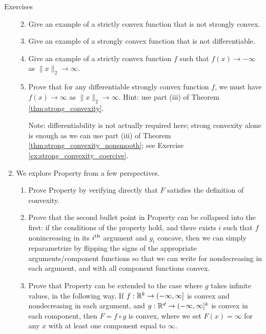 \begin{xcb}{Exercises}
\begin{enumerate}[label=\thechapter.\arabic*]
\begin{enumerate}[label=\alph*.]
\item Give an example of a strictly convex function that is not strongly
  convex. 
  
\item Give an example of a strongly convex function that is not differentiable. 

\item Give an example of a strictly convex function $f$ such that $f(x) \to
  -\infty$ as $\|x\|_2 \to \infty$. 

\item Prove that for any differentiable strongly convex function $f$, we must
  have $f(x) \to \infty$ as $\|x\|_2 \to \infty$. Hint: use part (iii) of Theorem
  \ref{thm:strong_convexity}.
  
  \smallskip
  Note: differentiability is not actually required here; strong convexity alone
  is enough as we can use part (iii) of Theorem
  \ref{thm:strong_convexity_nonsmooth}; see Exercise
  \ref{ex:strong_convexity_coercive}.  
\end{enumerate}

\item \label{ex:function_composition} 
  We explore Property  from a few perspectives.   

\begin{enumerate}[label=\alph*.]
\item Prove Property  by verifying directly
  that $F$ satisfies the definition of convexity. 

\item Prove that the second bullet point in Property
   can be collapsed into the first: if the
  conditions of the property hold, and there exists $i$ such that $f$
  nonincreasing in its $i^{\textnormal{th}}$ argument and $g_i$ concave, then we can simply
  reparametrize by flipping the signs of the appropriate arguments/component
  functions so that we can write  for
   nondecreasing in each argument, and  
  with all component functions convex. 

\item Prove that Property  can be extended to
  the case where $g$ takes infinite values, in the following way. If $f : \mathbb{R}^k
  \to (-\infty, \infty]$ is convex and nondecreasing in each argument, and $g :
  \mathbb{R}^d \to (-\infty, \infty]^k$ is convex in each component, then $F = f \circ
  g$ is convex, where we set $F(x) = \infty$ for any $x$ with at least one
  component equal to $\infty$.  
\end{enumerate}


\end{enumerate}
\end{xcb}
